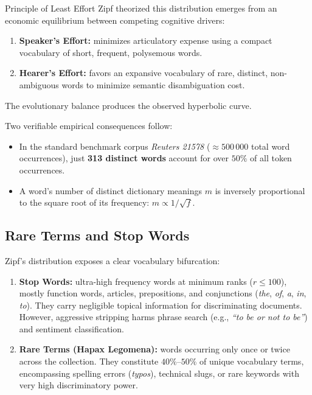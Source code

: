 \begin{noteblock}{Principle of Least Effort}
Zipf theorized this distribution emerges from an economic equilibrium between competing cognitive drivers:
\begin{enumerate}
    \item \textbf{Speaker's Effort:} minimizes articulatory expense using a compact vocabulary of short, frequent, polysemous words.
    \item \textbf{Hearer's Effort:} favors an expansive vocabulary of rare, distinct, non-ambiguous words to minimize semantic disambiguation cost.
\end{enumerate}
The evolutionary balance produces the observed hyperbolic curve.
\end{noteblock}

Two verifiable empirical consequences follow:
\begin{itemize}
    \item In the standard benchmark corpus \textit{Reuters 21578} ($\approx 500\,000$ total word occurrences), just \textbf{313 distinct words} account for over $50\%$ of all token occurrences.
    \item A word's number of distinct dictionary meanings $m$ is inversely proportional to the square root of its frequency: $m \propto 1 / \sqrt{f}$.
\end{itemize}

\subsection{Rare Terms and Stop Words}
Zipf's distribution exposes a clear vocabulary bifurcation:
\begin{enumerate}
    \item \textbf{Stop Words:} ultra-high frequency words at minimum ranks ($r \le 100$), mostly function words, articles, prepositions, and conjunctions (\textit{the}, \textit{of}, \textit{a}, \textit{in}, \textit{to}). They carry negligible topical information for discriminating documents. However, aggressive stripping harms phrase search (e.g., \textit{``to be or not to be''}) and sentiment classification.
    \item \textbf{Rare Terms (Hapax Legomena):} words occurring only once or twice across the collection. They constitute $40\%$--$50\%$ of unique vocabulary terms, encompassing spelling errors (\textit{typos}), technical slugs, or rare keywords with very high discriminatory power.
\end{enumerate}

